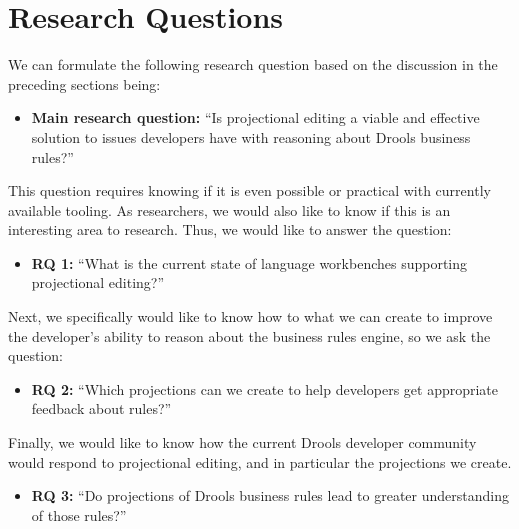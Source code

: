 \section{Research Questions}
\label{section:Research_Questions}

We can formulate the following research question based on the discussion in the preceding sections being:

\begin{itemize}
    \setlength\itemsep{0em}
    \item \textbf{Main research question:} ``Is projectional editing a viable and effective solution to issues developers have with reasoning about Drools business rules?''
\end{itemize}

This question requires knowing if it is even possible or practical with currently available tooling. 
As researchers, we would also like to know if this is an interesting area to research. 
Thus, we would like to answer the question:
\begin{itemize}
    \setlength\itemsep{0em}
    \item \textbf{RQ 1:} ``What is the current state of language workbenches supporting projectional editing?''
\end{itemize}

Next, we specifically would like to know how to what we can create to improve the developer's ability to reason about the business rules engine, so we ask the question:
\begin{itemize}
    \setlength\itemsep{0em}
    \item \textbf{RQ 2:} ``Which projections can we create to help developers get appropriate feedback about rules?''
\end{itemize}

Finally, we would like to know how the current Drools developer community would respond to projectional editing, and in particular the projections we create.
\begin{itemize}
    \setlength\itemsep{0em}
    \item  \textbf{RQ 3:} ``Do projections of Drools business rules lead to greater understanding of those rules?''
\end{itemize}
